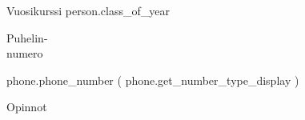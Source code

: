 {{{{{{{{{{\begin{description}
{{\begin{flushleft}
{{{{{{{{{{%
  \item [Vuosikurssi] {{ person.class_of_year }}
  {%
  \item [Puhelin-\\numero]
        \begin{flushleft}{%
           {{ phone.phone_number }} ({{ phone.get_number_type_display }})
        {%
  {%
\item [Opinnot]
\begin{flushleft}{%
{%
{%

}}}
\end{flushleft}}}}
\end{flushleft}}}}}}}}}}}}
\end{flushleft}}}
\end{description}}}}}}}}}}}

